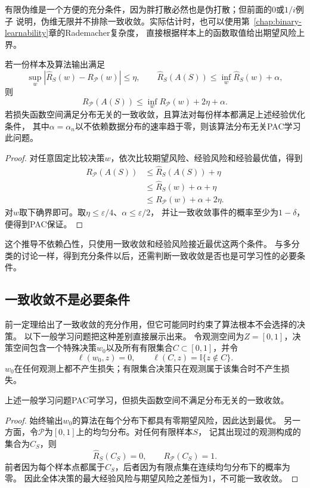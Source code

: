 有限伪维是一个方便的充分条件，因为胖打散必然也是伪打散；但前面的$0$或$1/i$例子
说明，伪维无限并不排除一致收敛。实际估计时，也可以使用第~\ref{chap:binary-learnability}章的Rademacher复杂度，
直接根据样本上的函数取值给出期望风险上界。

\begin{theorem}[一致收敛推出一般学习保证]
\label{thm:general-uniform-pac}
若一份样本及算法输出满足
\[
 \sup_w|\hat R_S(w)-R_{\mathcal P}(w)|\leq\eta,\qquad
 \hat R_S(A(S))\leq\inf_w\hat R_S(w)+\alpha,
\]
则
\[
 R_{\mathcal P}(A(S))\leq\inf_w R_{\mathcal P}(w)+2\eta+\alpha.
\]
若损失函数空间满足分布无关的一致收敛，且算法对每份样本都满足上述经验优化条件，
其中$\alpha=\alpha_n$以不依赖数据分布的速率趋于零，则该算法分布无关PAC学习此问题。
\end{theorem}
\begin{proof}
对任意固定比较决策$w$，依次比较期望风险、经验风险和经验最优值，得到
\begin{align*}
 R_{\mathcal P}(A(S))&\leq\hat R_S(A(S))+\eta\\
 &\leq\hat R_S(w)+\alpha+\eta\\
 &\leq R_{\mathcal P}(w)+\alpha+2\eta.
\end{align*}
对$w$取下确界即可。取$\eta\leq\varepsilon/4$、$\alpha\leq\varepsilon/2$，
并让一致收敛事件的概率至少为$1-\delta$，便得到PAC保证。
\end{proof}

这个推导不依赖凸性，只使用一致收敛和经验风险接近最优这两个条件。
与多分类的讨论一样，得到充分条件以后，还需判断一致收敛是否也是可学习性的必要条件。

\subsection{一致收敛不是必要条件}

前一定理给出了一致收敛的充分作用，但它可能同时约束了算法根本不会选择的决策。
以下一般学习问题把这种差别直接展示出来。
令观测空间为$Z=[0,1]$，决策空间包含一个特殊决策$w_0$以及所有有限集合$C\subset[0,1]$，并令
\[
 \ell(w_0,z)=0,\qquad \ell(C,z)=\mathbb I\{z\notin C\}.
\]
$w_0$在任何观测上都不产生损失；有限集合决策只在观测属于该集合时不产生损失。

\begin{theorem}[可学习性不推出一致收敛]
\label{thm:general-learning-without-uniform}
上述一般学习问题PAC可学习，但损失函数空间不满足分布无关的一致收敛。
\end{theorem}
\begin{proof}
始终输出$w_0$的算法在每个分布下都具有零期望风险，因此达到最优。
另一方面，令$\mathcal P$为$[0,1]$上的均匀分布。对任何有限样本$S$，
记其出现过的观测构成的集合为$C_S$，则
\[
 \hat R_S(C_S)=0,\qquad R_{\mathcal P}(C_S)=1.
\]
前者因为每个样本点都属于$C_S$，后者因为有限点集在连续均匀分布下的概率为零。
因此全体决策的最大经验风险与期望风险之差恒为1，不可能一致收敛。
\end{proof}

